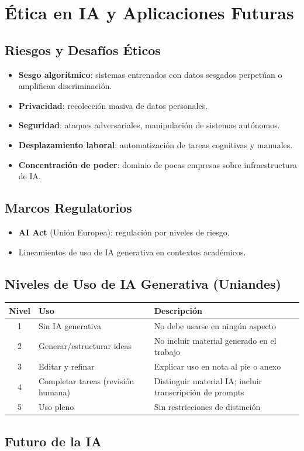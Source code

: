 \section{Ética en IA y Aplicaciones Futuras}

\subsection{Riesgos y Desafíos Éticos}

\begin{itemize}
    \item \textbf{Sesgo algorítmico}: sistemas entrenados con datos sesgados perpetúan o amplifican discriminación.
    \item \textbf{Privacidad}: recolección masiva de datos personales.
    \item \textbf{Seguridad}: ataques adversariales, manipulación de sistemas autónomos.
    \item \textbf{Desplazamiento laboral}: automatización de tareas cognitivas y manuales.
    \item \textbf{Concentración de poder}: dominio de pocas empresas sobre infraestructura de IA.
\end{itemize}

\subsection{Marcos Regulatorios}

\begin{itemize}
    \item \textbf{AI Act} (Unión Europea): regulación por niveles de riesgo.
    \item Lineamientos de uso de IA generativa en contextos académicos.
\end{itemize}

\subsection{Niveles de Uso de IA Generativa (Uniandes)}

\begin{tabular}{cll}
\toprule
\textbf{Nivel} & \textbf{Uso} & \textbf{Descripción} \\
\midrule
1 & Sin IA generativa & No debe usarse en ningún aspecto \\
2 & Generar/estructurar ideas & No incluir material generado en el trabajo \\
3 & Editar y refinar & Explicar uso en nota al pie o anexo \\
4 & Completar tareas (revisión humana) & Distinguir material IA; incluir transcripción de prompts \\
5 & Uso pleno & Sin restricciones de distinción \\
\bottomrule
\end{tabular}

\subsection{Futuro de la IA}


